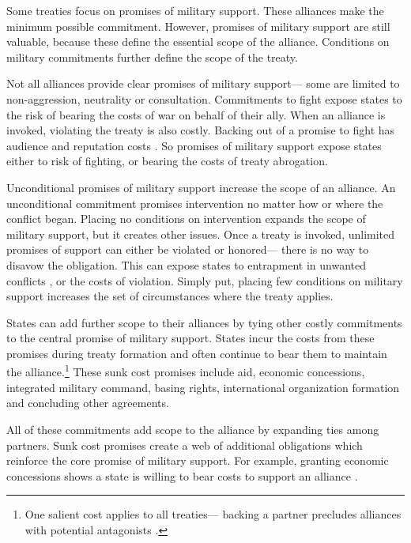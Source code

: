 \documentclass[12pt]{article}
\begin{document}
Some treaties focus on promises of military support. 
These alliances make the minimum possible commitment. 
However, promises of military support are still valuable, because these define the essential scope of the alliance.  
Conditions on military commitments further define the scope of the treaty. 


Not all alliances provide clear promises of military support--- some are limited to non-aggression, neutrality or consultation. 
Commitments to fight expose states to the risk of bearing the costs of war on behalf of their ally. 
When an alliance is invoked, violating the treaty is also costly. 
Backing out of a promise to fight has audience \citep{Levyetal2015} and reputation costs \citep{Gibler2008, Crescenzietal2012, Mattes2012}. 
So promises of military support expose states either to risk of fighting, or bearing the costs of treaty abrogation. 


Unconditional promises of military support increase the scope of an alliance. 
An unconditional commitment promises intervention no matter how or where the conflict began. 
Placing no conditions on intervention expands the scope of military support, but it creates other issues. 
Once a treaty is invoked, unlimited promises of support can either be violated or honored--- there is no way to disavow the obligation. 
This can expose states to entrapment in unwanted conflicts \citep{Snyder1990, Benson2012}, or the costs of violation. 
Simply put, placing few conditions on military support increases the set of circumstances where the treaty applies.  


States can add further scope to their alliances by tying other costly commitments to the central promise of military support. 
States incur the costs from these promises during treaty formation and often continue to bear them to maintain the alliance.\footnote{
One salient cost applies to all treaties--- backing a partner precludes alliances with potential antagonists \citep{Snyder1997}.} 
These sunk cost promises include aid, economic concessions, integrated military command, basing rights, international organization formation and concluding other agreements. 


All of these commitments add scope to the alliance by expanding ties among partners. 
Sunk cost promises create a web of additional obligations which reinforce the core promise of military support.  
For example, granting economic concessions shows a state is willing to bear costs to support an alliance \citep{WolfordKim2017}. 
\end{document}
